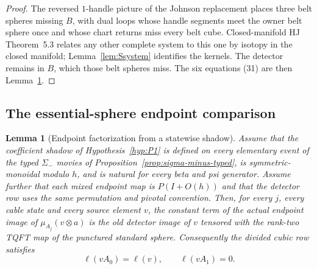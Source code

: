 \documentclass[11pt]{amsart}
\newtheorem{lemma}[theorem]{Lemma}
\theoremstyle{definition}
\theoremstyle{remark}
\begin{document}
\begin{proof}
The reversed $1$-handle picture of the Johnson replacement places three
belt spheres missing $B$, with dual loops whose handle segments meet the
owner belt sphere once and whose chart returns miss every belt cube.
Closed-manifold HJ Theorem~5.3 relates any other complete
system to this one by isotopy in the closed manifold; Lemma~\ref{lem:Ssystem}
identifies the kernels.  The detector remains in $B$, which those belt
spheres miss.  The six equations (31) are then Lemma~\ref{lem:Sendpoint}.
\end{proof}

\subsection{The essential-sphere endpoint comparison}

\begin{lemma}[Endpoint factorization from a statewise shadow]\label{lem:Sendpoint}
Assume that the coefficient shadow of Hypothesis~\ref{hyp:P1} is defined on
every elementary event of the typed $\Sigma_-$ movies of
Proposition~\ref{prop:sigma-minus-typed}, is symmetric-monoidal modulo $h$,
and is natural for every beta and psi generator.  Assume further that each
mixed endpoint map is $P(I+O(h))$ and that the detector row uses the same
permutation and pivotal convention.  Then, for every \(j\), every cable state and every source element \(v\), the
constant term of the actual endpoint image of
\(\mu_{A_j}(v\otimes a)\) is the old detector image of \(v\) tensored with
the rank-two TQFT map of the punctured standard sphere.  Consequently the
divided cubic row satisfies
\[
\ell(vA_0)=\ell(v),\qquad \ell(vA_1)=0.
\]
\end{lemma}
\end{document}
